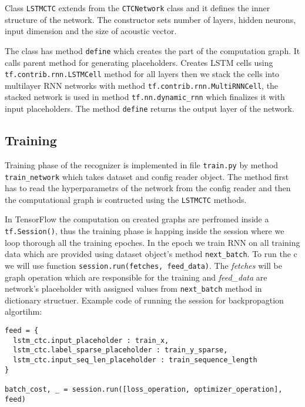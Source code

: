 Class \texttt{LSTMCTC} extends from the \texttt{CTCNetwork} class and it defines the inner structure of the network.
The constructor sets number of layers, hidden neurons, input dimension and the size of acoustic vector.

The class has method \texttt{define} which creates the part of the computation graph.
It calls parent method for generating placeholders.
Creates LSTM cells using \texttt{tf.contrib.rnn.LSTMCell} method for all layers then we stack the cells into multilayer RNN networks with method \texttt{tf.contrib.rnn.MultiRNNCell}, the stacked network is used in method \texttt{tf.nn.dynamic\_rnn} which finalizes it with input placeholders.
The method \texttt{define} returns the output layer of the network.

\subsection{Training}

Training phase of the recognizer is implemented in file \texttt{train.py} by method \texttt{train\_network} which takes dataset and config reader object.
The method first has to read the hyperparametrs of the network from the config reader and then the computational graph is contructed using the \texttt{LSTMCTC} methods.

In TensorFlow the computation on created graphs are perfromed inside a \texttt{tf.Session()}, thus the training phase is happing inside the session where we loop thorough all the training epoches.
In the epoch we train RNN on all training data which are provided using dataset object's method \texttt{next\_batch}.
To run the c we will use function \texttt{session.run(fetches, feed\_data)}. The \textit{fetches} will be graph operation which are responsible for the training and \textit{feed\_data} are network's placeholder with assigned values from \texttt{next\_batch} method in dictionary structuer.
Example code of running the session for backpropagtion algortihm:

\begin{lstlisting}
feed = {
  lstm_ctc.input_placeholder : train_x,
  lstm_ctc.label_sparse_placeholder : train_y_sparse,
  lstm_ctc.input_seq_len_placeholder : train_sequence_length
}

batch_cost, _ = session.run([loss_operation, optimizer_operation], feed)
\end{lstlisting}

